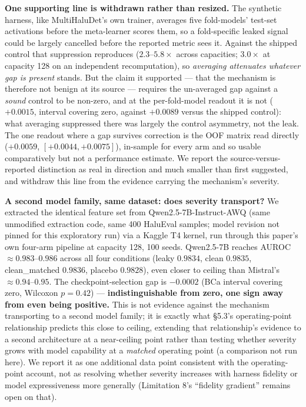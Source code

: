 \documentclass[10pt]{article} %
\begin{document}
\textbf{One supporting line is withdrawn rather than resized.} The synthetic
harness, like MultiHaluDet's own trainer, averages five fold-models' test-set
activations before the meta-learner scores them, so a fold-specific leaked
signal could be largely cancelled before the reported metric sees it. Against
the shipped control that suppression reproduces ($2.3$--$5.8\times$ across
capacities; $3.0\times$ at capacity 128 on an independent recomputation), so
\emph{averaging attenuates whatever gap is present} stands. But the claim it
supported --- that the mechanism is therefore not benign at its source ---
requires the un-averaged gap against a \emph{sound} control to be non-zero,
and at the per-fold-model readout it is not ($+0.0015$, interval covering
zero, against $+0.0089$ versus the shipped control): what averaging
suppressed there was largely the control asymmetry, not the leak. The one
readout where a gap survives correction is the OOF matrix read directly
($\mathbf{+0.0059}$, $[+0.0044,+0.0075]$), in-sample for every arm and so
usable comparatively but not a performance estimate. We report the
source-versus-reported distinction as real in direction and much smaller
than first suggested, and withdraw this line from the evidence carrying the
mechanism's severity.

\textbf{A second model family, same dataset: does severity transport?} We
extracted the identical feature set from Qwen2.5-7B-Instruct-AWQ (same
unmodified extraction code, same 400 HaluEval samples; model revision not
pinned for this exploratory run) via a Kaggle T4 kernel, run through this
paper's own four-arm pipeline at capacity 128, 100 seeds. Qwen2.5-7B reaches
AUROC $\approx0.983$--$0.986$ across all four conditions (leaky $0.9834$,
clean $0.9835$, clean\_matched $0.9836$, placebo $0.9828$), even closer to
ceiling than Mistral's $\approx0.94$--$0.95$. The checkpoint-selection gap is
$-0.0002$ (BCa interval covering zero, Wilcoxon $p=0.42$) ---
\textbf{indistinguishable from zero, one sign away from even being
positive.} This is not evidence against the mechanism transporting to a
second model family; it is exactly what §5.3's operating-point relationship
predicts this close to ceiling, extending that relationship's evidence to a
second architecture at a near-ceiling point rather than testing whether
severity grows with model capability at a \emph{matched} operating point (a
comparison not run here). We report it as one additional data point
consistent with the operating-point account, not as resolving whether
severity increases with harness fidelity or model expressiveness more
generally (Limitation 8's ``fidelity gradient'' remains open on that).
\end{document}
